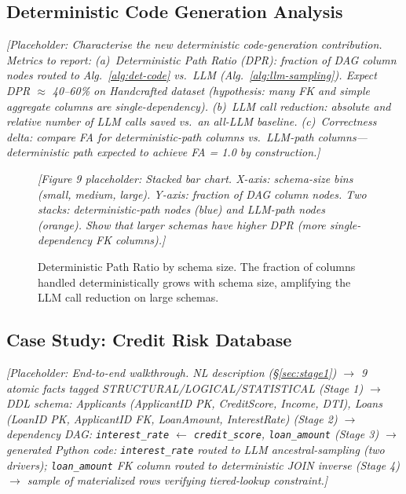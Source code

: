 \subsection{Deterministic Code Generation Analysis}
\label{subsec:det-eval}

\textit{[Placeholder: Characterise the new deterministic code-generation contribution.
Metrics to report: (a)~\emph{Deterministic Path Ratio (DPR)}: fraction of DAG column
nodes routed to Alg.~\ref{alg:det-code} vs.\ LLM (Alg.~\ref{alg:llm-sampling}).
Expect DPR $\approx$ 40--60\% on Handcrafted dataset (hypothesis: many FK and simple
aggregate columns are single-dependency).
(b)~LLM call reduction: absolute and relative number of LLM calls saved vs.\ an
all-LLM baseline.
(c)~Correctness delta: compare FA for deterministic-path columns vs.\ LLM-path columns---
deterministic path expected to achieve FA = 1.0 by construction.]}

\begin{figure}[t]
  \centering
  \vspace{1.5cm}
  \textit{[Figure 9 placeholder: Stacked bar chart.
  X-axis: schema-size bins (small, medium, large).
  Y-axis: fraction of DAG column nodes.
  Two stacks: deterministic-path nodes (blue) and LLM-path nodes (orange).
  Show that larger schemas have higher DPR (more single-dependency FK columns).]}
  \vspace{1.5cm}
  \caption{Deterministic Path Ratio by schema size.
           The fraction of columns handled deterministically grows with schema size,
           amplifying the LLM call reduction on large schemas.}
  \label{fig:dpr}
\end{figure}

\subsection{Case Study: Credit Risk Database}
\label{subsec:case-study}

\textit{[Placeholder: End-to-end walkthrough.
NL description (\S\ref{sec:stage1}) $\to$ 9 atomic facts tagged STRUCTURAL/LOGICAL/STATISTICAL
(Stage 1) $\to$ DDL schema: Applicants (ApplicantID PK, CreditScore, Income, DTI),
Loans (LoanID PK, ApplicantID FK, LoanAmount, InterestRate) (Stage 2)
$\to$ dependency DAG: \texttt{interest\_rate} $\leftarrow$ \texttt{credit\_score},
\texttt{loan\_amount} (Stage 3)
$\to$ generated Python code: \texttt{interest\_rate} routed to LLM ancestral-sampling
(two drivers); \texttt{loan\_amount} FK column routed to deterministic JOIN inverse (Stage 4)
$\to$ sample of materialized rows verifying tiered-lookup constraint.]}

